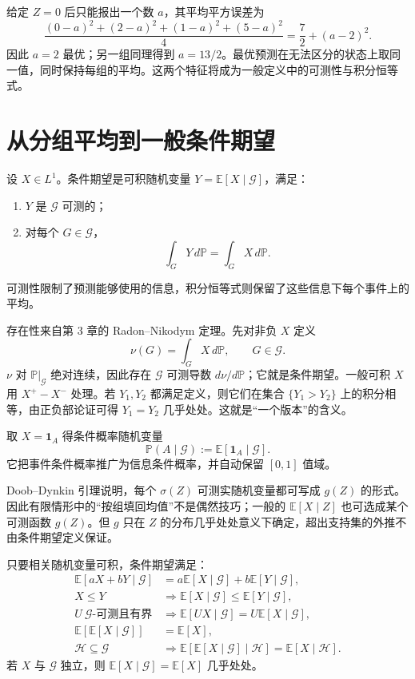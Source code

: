 给定 $Z=0$ 后只能报出一个数 $a$，其平均平方误差为
\[
\frac{(0-a)^2+(2-a)^2+(1-a)^2+(5-a)^2}{4}
=\frac72+(a-2)^2.
\]
因此 $a=2$ 最优；另一组同理得到 $a=13/2$。最优预测在无法区分的状态上取同一值，同时保持每组的平均。这两个特征将成为一般定义中的可测性与积分恒等式。

\section{从分组平均到一般条件期望}

设 $X\in L^1$。条件期望是可积随机变量 $Y=\mathbb{E}[X\mid\mathcal G]$，满足：
\begin{enumerate}[nosep]
  \item $Y$ 是 $\mathcal G$ 可测的；
  \item 对每个 $G\in\mathcal G$，
  \[
    \int_GY\,d\mathbb P=\int_GX\,d\mathbb P.
  \]
\end{enumerate}
可测性限制了预测能够使用的信息，积分恒等式则保留了这些信息下每个事件上的平均。

存在性来自第 3 章的 Radon--Nikodym 定理。先对非负 $X$ 定义
\[
  \nu(G)=\int_GX\,d\mathbb P,\qquad G\in\mathcal G.
\]
$\nu$ 对 $\mathbb P|_{\mathcal G}$ 绝对连续，因此存在 $\mathcal G$ 可测导数
$d\nu/d\mathbb P$；它就是条件期望。一般可积 $X$ 用 $X^+-X^-$ 处理。若 $Y_1,Y_2$ 都满足定义，则它们在集合 $\{Y_1>Y_2\}$ 上的积分相等，由正负部论证可得 $Y_1=Y_2$ 几乎处处。这就是“一个版本”的含义。

取 $X=\mathbf1_A$ 得条件概率随机变量
\[
  \mathbb P(A\mid\mathcal G)
  :=\mathbb E[\mathbf1_A\mid\mathcal G].
\]
它把事件条件概率推广为信息条件概率，并自动保留 $[0,1]$ 值域。


Doob--Dynkin 引理说明，每个 $\sigma(Z)$ 可测实随机变量都可写成 $g(Z)$ 的形式。因此有限情形中的“按组填回均值”不是偶然技巧；一般的
$\mathbb E[X\mid Z]$ 也可选成某个可测函数 $g(Z)$。但 $g$ 只在 $Z$ 的分布几乎处处意义下确定，超出支持集的外推不由条件期望定义保证。


只要相关随机变量可积，条件期望满足：
\begin{align*}
 \mathbb E[aX+bY\mid\mathcal G]
   &=a\mathbb E[X\mid\mathcal G]+b\mathbb E[Y\mid\mathcal G],\\
 X\le Y&\Longrightarrow
   \mathbb E[X\mid\mathcal G]\le\mathbb E[Y\mid\mathcal G],\\
 U\ \mathcal G\text{-可测且有界}
 &\Longrightarrow \mathbb E[UX\mid\mathcal G]
   =U\mathbb E[X\mid\mathcal G],\\
 \mathbb E[\mathbb E[X\mid\mathcal G]]&=\mathbb E[X],\\
 \mathcal H\subseteq\mathcal G
 &\Longrightarrow
 \mathbb E[\mathbb E[X\mid\mathcal G]\mid\mathcal H]
 =\mathbb E[X\mid\mathcal H].
\end{align*}
若 $X$ 与 $\mathcal G$ 独立，则 $\mathbb E[X\mid\mathcal G]=\mathbb E[X]$ 几乎处处。

